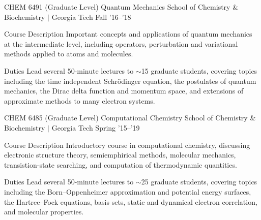 \begin{cventries}


  \cvteachingentry
    {CHEM 6491 (Graduate Level)} %
    {Quantum Mechanics} %
    {School of Chemistry \& Biochemistry $\vert$ Georgia Tech} %
    {Fall '16--'18} %
    {%
    \begin{cvdescription}
    \item[Course Description] Important concepts and applications of quantum mechanics
        at the intermediate level, including operators, perturbation and variational
        methods applied to atoms and molecules.
    \item[Duties] Lead several 50-minute lectures to $\sim$15 graduate students, covering
        topics including the time independent Schr\"odinger equation, the postulates of
        quantum mechanics, the Dirac delta function and momentum space, and extensions
        of approximate methods to many electron systems.
    \end{cvdescription}
    }

  \cvteachingentry
    {CHEM 6485 (Graduate Level)} %
    {Computational Chemistry} %
    {School of Chemistry \& Biochemistry $\vert$ Georgia Tech} %
    {Spring '15--'19} %
    {%
    \begin{cvdescription}
    \item[Course Description] Introductory course in computational chemistry, discussing
        electronic structure theory, semiemphirical methods, molecular mechanics, 
        transistion-state searching, and computation of thermodynamic quantities. 
    \item[Duties] Lead several 50-minute lectures to $\sim$25 graduate students, covering
        topics including the Born--Oppenheimer approximation and potential energy surfaces,
        the Hartree--Fock equations, basis sets, static and dynamical electron correlation,
        and molecular properties.
    \end{cvdescription}
    }


\end{cventries}
